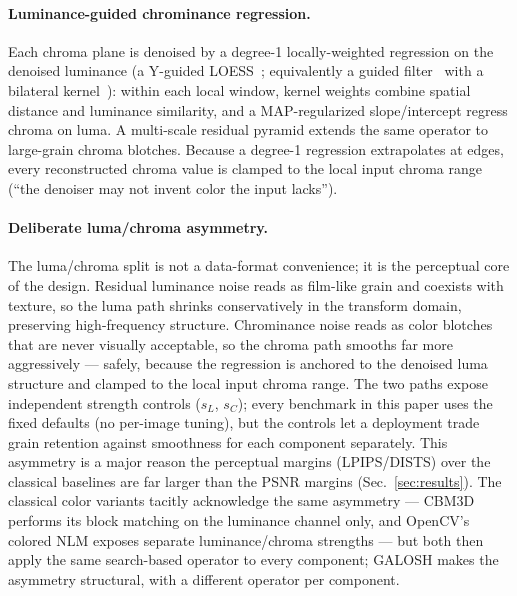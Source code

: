 \documentclass[10pt,twocolumn]{article}
\begin{document}
\paragraph{Luminance-guided chrominance regression.}
Each chroma plane is denoised by a degree-1 locally-weighted regression on the
denoised luminance (a Y-guided LOESS~\cite{loess}; equivalently a guided
filter~\cite{guidedfilter} with a bilateral kernel~\cite{kopf}): within each
local window, kernel weights combine spatial distance and luminance
similarity, and a MAP-regularized slope/intercept regress chroma on luma. A
multi-scale residual pyramid extends the same operator to large-grain chroma
blotches. Because a degree-1 regression extrapolates at edges, every
reconstructed chroma value is clamped to the local input chroma range
(``the denoiser may not invent color the input lacks'').

\paragraph{Deliberate luma/chroma asymmetry.}
The luma/chroma split is not a data-format convenience; it is the perceptual
core of the design. Residual luminance noise reads as film-like grain and
coexists with texture, so the luma path shrinks conservatively in the
transform domain, preserving high-frequency structure. Chrominance noise reads
as color blotches that are never visually acceptable, so the chroma path
smooths far more aggressively --- safely, because the regression is anchored
to the denoised luma structure and clamped to the local input chroma range.
The two paths expose independent strength controls ($s_L$, $s_C$); every
benchmark in this paper uses the fixed defaults (no per-image tuning), but the
controls let a deployment trade grain retention against smoothness for each
component separately. This asymmetry is a major reason the perceptual margins
(LPIPS/DISTS) over the classical baselines are far larger than the PSNR
margins (Sec.~\ref{sec:results}). The classical color variants tacitly
acknowledge the same asymmetry --- CBM3D performs its block matching on the
luminance channel only, and OpenCV's colored NLM exposes separate
luminance/chroma strengths --- but both then apply the same search-based
operator to every component; GALOSH makes the asymmetry structural, with a
different operator per component.
\end{document}
